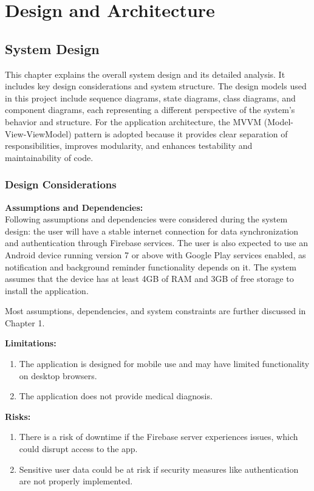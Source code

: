 \documentclass[12pt, a4paper, oneside]{report}
\begin{document}
\chapter{Design and Architecture}
\label{ch:design}

\section{System Design}

This chapter explains the overall system design and its detailed analysis. It includes key design considerations and system structure. The design models used in this project include sequence diagrams, state diagrams, class diagrams, and component diagrams, each representing a different perspective of the system's behavior and structure. For the application architecture, the MVVM (Model-View-ViewModel) pattern is adopted because it provides clear separation of responsibilities, improves modularity, and enhances testability and maintainability of code.

\subsection{Design Considerations}

\textbf{Assumptions and Dependencies:}\\
Following assumptions and dependencies were considered during the system design: the user will have a stable internet connection for data synchronization and authentication through Firebase services. The user is also expected to use an Android device running version 7 or above with Google Play services enabled, as notification and background reminder functionality depends on it. The system assumes that the device has at least 4GB of RAM and 3GB of free storage to install the application.

Most assumptions, dependencies, and system constraints are further discussed in Chapter 1.

\textbf{Limitations:}
\begin{enumerate}
    \item The application is designed for mobile use and may have limited functionality on desktop browsers.
    \item The application does not provide medical diagnosis.
\end{enumerate}

\textbf{Risks:}
\begin{enumerate}
    \item There is a risk of downtime if the Firebase server experiences issues, which could disrupt access to the app.
    \item Sensitive user data could be at risk if security measures like authentication are not properly implemented.
\end{enumerate}
\end{document}
